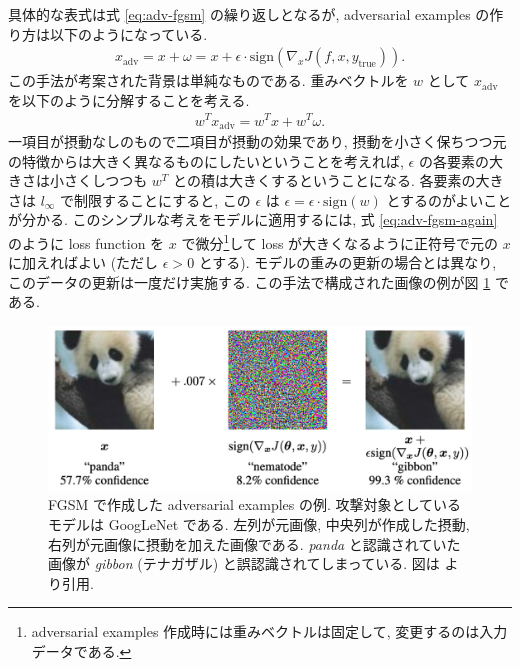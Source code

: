 具体的な表式は式 \ref{eq:adv-fgsm} の繰り返しとなるが, adversarial examples の作り方は以下のようになっている.
%
\begin{eqnarray}
x_{\text{adv}} = x + \omega = x + \epsilon \cdot \text{sign} ( \nabla_x J (f, x, y_{\text{true}}) ).
\label{eq:adv-fgsm-again}
\end{eqnarray}
%
この手法が考案された背景は単純なものである.
重みベクトルを $w$ として $x_{\text{adv}}$ を以下のように分解することを考える.
%
\begin{eqnarray}
w^T x_{\text{adv}} = w^T x + w^T \omega.
\label{eq:adv_decompose}
\end{eqnarray}
%
一項目が摂動なしのもので二項目が摂動の効果であり, 摂動を小さく保ちつつ元の特徴からは大きく異なるものにしたいということを考えれば, $\epsilon$ の各要素の大きさは小さくしつつも $w^T$ との積は大きくするということになる.
各要素の大きさは $l_\infty$ で制限することにすると, この $\epsilon$ は $\epsilon = \epsilon \cdot \text{sign} (w)$ とするのがよいことが分かる.
このシンプルな考えをモデルに適用するには, 式 \ref{eq:adv-fgsm-again} のように loss function を $x$ で微分\footnote{
adversarial examples 作成時には重みベクトルは固定して, 変更するのは入力データである.
}して loss が大きくなるように正符号で元の $x$ に加えればよい (ただし $\epsilon > 0$ とする).
モデルの重みの更新の場合とは異なり, このデータの更新は一度だけ実施する.
この手法で構成された画像の例が図 \ref{fig:goodfellow-adv-example} である.
%
\begin{figure}[htbp]
\begin{center}
\includegraphics[width=12.0cm]{figures/goodfellow-adv-examples.pdf}
\end{center}
\caption{
FGSM で作成した adversarial examples の例.
攻撃対象としているモデルは GoogLeNet \cite{szegedy2015going} である.
左列が元画像, 中央列が作成した摂動, 右列が元画像に摂動を加えた画像である.
\textit{panda} と認識されていた画像が \textit{gibbon} (テナガザル) と誤認識されてしまっている.
図は \cite{goodfellow2014explaining} より引用.
}
\label{fig:goodfellow-adv-example}
\end{figure}
%

